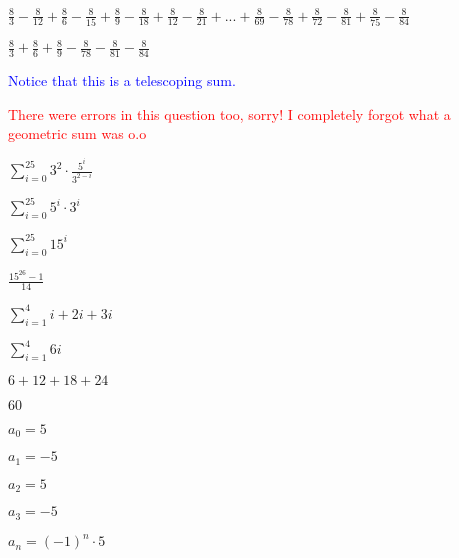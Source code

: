 \documentclass{exam}
\begin{document}
\begin{questions}
\begin{subparts}
\begin{center}
\( \frac{8}{3} - \frac{8}{12} + \frac{8}{6} - \frac{8}{15} + \frac{8}{9} - \frac{8}{18} + \frac{8}{12} - \frac{8}{21} + ... + \frac{8}{69} - \frac{8}{78} + \frac{8}{72} - \frac{8}{81} + \frac{8}{75} - \frac{8}{84}\)

\( \frac{8}{3} + \frac{8}{6} + \frac{8}{9} - \frac{8}{78} - \frac{8}{81} - \frac{8}{84}\)

\textcolor{blue}{Notice that this is a telescoping sum.}

\end{center}


\begin{center}

\textcolor{red}{There were errors in this question too, sorry! I completely forgot what a geometric sum was o.o}

\( \sum_{i=0}^{25} 3^2 \cdot \frac{{5^{i}}}{3^{2-i}} \)

\( \sum_{i=0}^{25} 5^{i} \cdot 3^{i} \)

\( \sum_{i=0}^{25} {15}^{i} \)

\( \frac{15^{26}-1}{14} \)

\end{center}


\begin{center}

\( \sum_{i=1}^{4} i + 2i + 3i \)

\( \sum_{i=1}^{4} 6i \)

\( 6 + 12 + 18 + 24 \)

\( 60 \)

\end{center}

\end{subparts}

\begin{subparts}

\begin{center}

\(a_0 = 5\)

\(a_1 = -5\)

\(a_2 = 5\)

\(a_3 = -5\)

\(a_n = (-1)^n \cdot 5\)


\end{center}
\end{subparts}
\end{questions}
\end{document}
